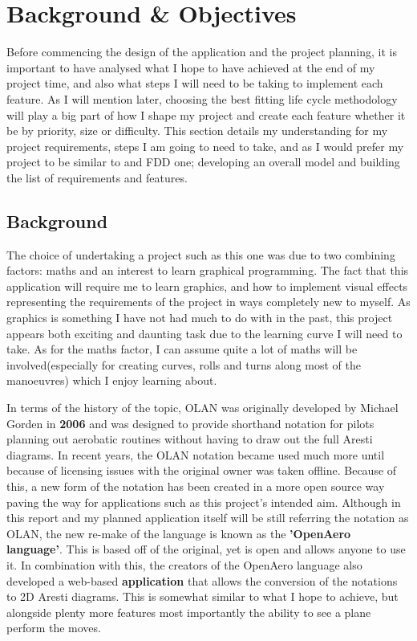 \chapter{Background \& Objectives}
Before commencing the design of the application and the project planning, it is important to have analysed what I hope to have achieved at the end of my project time, and also what steps I will need to be taking to implement each feature. As I will mention later, choosing the best fitting life cycle methodology will play a big part of how I shape my project and create each feature whether it be by priority, size or difficulty. This section details my understanding for my project requirements, steps I am going to need to take, and as I would prefer my project to be similar to and FDD one; developing an overall model and building the list of requirements and features.

\section{Background}
The choice of undertaking a project such as this one was due to two combining factors: maths and an interest to learn graphical programming. The fact that this application will require me to learn graphics, and how to implement visual effects representing the requirements of the project in ways completely new to myself. As graphics is something I have not had much to do with in the past, this project appears both exciting and daunting task due to the learning curve I will need to take. As for the maths factor, I can assume quite a lot of maths will be involved(especially for creating curves, rolls and turns along most of the manoeuvres) which I enjoy learning about.

In terms of the history of the topic, OLAN was originally developed by Michael Gorden in \textbf{2006} and was designed to provide shorthand notation for pilots planning out aerobatic routines without having to draw out the full Aresti diagrams. In recent years, the OLAN notation became used much more until because of licensing issues with the original owner was taken offline. Because of this, a new form of the notation has been created in a more open source way paving the way for applications such as this project's intended aim. Although in this report and my planned application itself will be still referring the notation as OLAN, the new re-make of the language is known as the \textbf{'OpenAero language'}. This is based off of the original, yet is open and allows anyone to use it. In combination with this, the creators of the OpenAero language also developed a web-based \textbf{application} that allows the conversion of the notations to 2D Aresti diagrams. This is somewhat similar to what I hope to achieve, but alongside plenty more features most importantly the ability to see a plane perform the moves.


